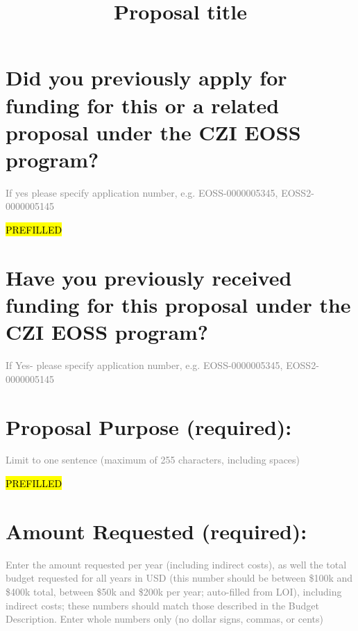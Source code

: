 \title{Proposal title}

\date{\vspace{-8ex}}  %

\maketitle


\section{Did you previously apply for funding for this or a related proposal under the CZI EOSS program?}
\textcolor{gray}{If yes please specify application number, e.g. EOSS-0000005345, EOSS2-0000005145}

\hl{PREFILLED}  

\section{Have you previously received funding for this proposal under the CZI EOSS program?}
\textcolor{gray}{If Yes- please specify application number, e.g. EOSS-0000005345, EOSS2-0000005145}

\section{Proposal Purpose (required):}
\textcolor{gray}{Limit to one sentence (maximum of 255 characters, including spaces)}


\hl{PREFILLED}  



\section{Amount Requested (required):}
\textcolor{gray}{Enter the amount requested per year (including indirect costs), as well the total budget requested for all years in USD (this number should be between \$100k and \$400k total, between \$50k and \$200k per year; auto-filled from LOI), including indirect costs; these numbers should match those described in the Budget Description. Enter whole numbers only (no dollar signs, commas, or cents)}

